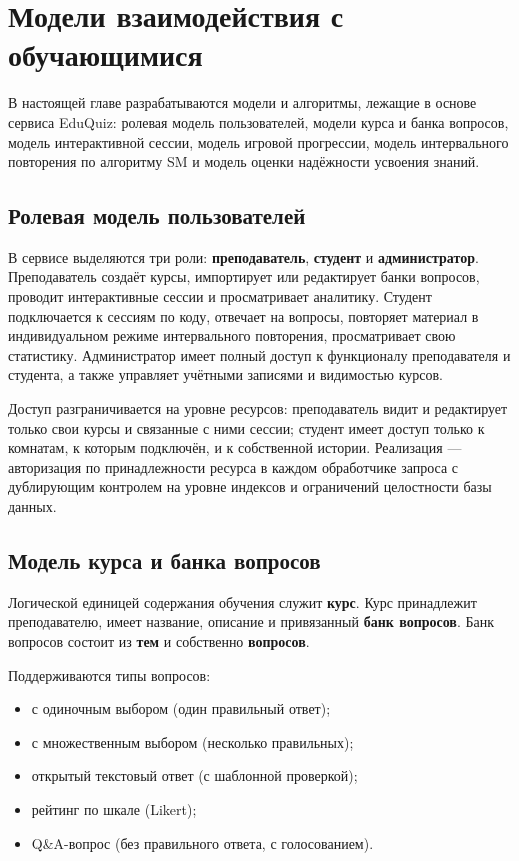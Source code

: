 \section{Модели взаимодействия с обучающимися}
\thispagestyle{plain}

В настоящей главе разрабатываются модели и алгоритмы, лежащие
в основе сервиса EduQuiz: ролевая модель пользователей, модели
курса и банка вопросов, модель интерактивной сессии, модель
игровой прогрессии, модель интервального повторения по алгоритму
SM и модель оценки надёжности усвоения знаний.

\subsection{Ролевая модель пользователей}

В сервисе выделяются три роли: \textbf{преподаватель},
\textbf{студент} и \textbf{администратор}. Преподаватель создаёт
курсы, импортирует или редактирует банки вопросов, проводит
интерактивные сессии и просматривает аналитику.
Студент подключается к сессиям по коду, отвечает на вопросы,
повторяет материал в индивидуальном режиме интервального повторения,
просматривает свою статистику. Администратор имеет полный доступ
к функционалу преподавателя и студента, а также управляет
учётными записями и видимостью курсов.

Доступ разграничивается на уровне ресурсов: преподаватель видит
и редактирует только свои курсы и связанные с ними сессии;
студент имеет доступ только к комнатам, к которым подключён,
и к собственной истории. Реализация --- авторизация по принадлежности
ресурса в каждом обработчике запроса с дублирующим контролем
на уровне индексов и ограничений целостности базы данных.

\subsection{Модель курса и банка вопросов}

Логической единицей содержания обучения служит \textbf{курс}.
Курс принадлежит преподавателю, имеет название, описание и
привязанный \textbf{банк вопросов}. Банк вопросов состоит
из \textbf{тем} и собственно \textbf{вопросов}.

Поддерживаются типы вопросов:
\begin{itemize}[noitemsep]
    \item с одиночным выбором (один правильный ответ);
    \item с множественным выбором (несколько правильных);
    \item открытый текстовый ответ (с шаблонной проверкой);
    \item рейтинг по шкале (Likert);
    \item Q\&A-вопрос (без правильного ответа, с голосованием).
\end{itemize}

